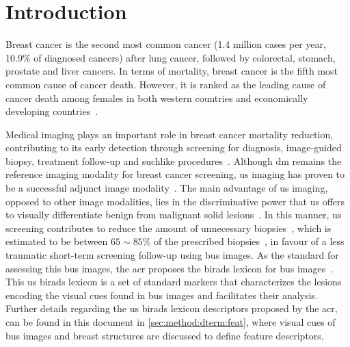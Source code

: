 \graphicspath{ {./content/intro/figures/} }

\section{Introduction}
\label{sec:intro}  %


Breast cancer is the second most common cancer (1.4 million cases per year, 10.9\% of  diagnosed cancers) after lung cancer, followed by colorectal, stomach, prostate and liver cancers. %
In terms of mortality, breast cancer is the fifth most common cause of cancer death.
However, it is ranked as the leading cause of cancer death among females in both western countries and economically developing countries~\cite{cancerStatistics2011}.

Medical imaging plays an important role in breast cancer mortality reduction, contributing to its early detection through screening for diagnosis, image-guided biopsy, treatment follow-up and suchlike procedures~\cite{smith2003american}.
Although \ac{dm} remains the reference imaging modality for breast cancer screening, \ac{us} imaging has proven to be a successful adjunct image modality~\cite{smith2003american}.%
The main advantage of \ac{us} imaging, opposed to other image modalities, lies in the discriminative power that \ac{us} offers to visually differentiate benign from malignant solid lesions~\cite{Stavros:1995p12392}.
In this manner, \ac{us} screening contributes to reduce the amount of unnecessary biopsies~\cite{ciatto1994contribution}, which is estimated to be between $65\sim85\%$ of the prescribed biopsies~\cite{yuan2010multimodality}, in favour of a less traumatic short-term screening follow-up using \ac{bus} images. %
As the standard for assessing this \ac{bus} images, the \ac{acr} proposes the \ac{birads} lexicon for \ac{bus} images~\cite{biradsus}.
This \ac{us} \ac{birads} lexicon is a set of standard markers that characterizes the lesions encoding the visual cues found in \ac{bus} images and facilitates their analysis.
Further details regarding the \ac{us} \ac{birads} lexicon descriptors proposed by the \ac{acr}, can be found in this document in \cref{sec:method:dterm:feat}, where visual cues of \ac{bus} images and breast structures are discussed to define feature descriptors.

